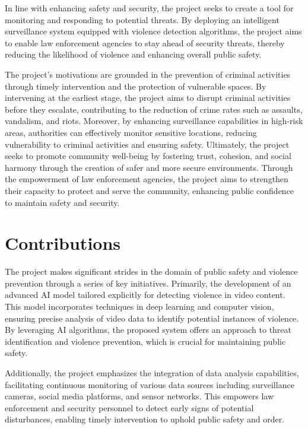 \noindent In line with enhancing safety and security, the project seeks to create a tool for monitoring and responding to potential threats. By deploying an intelligent surveillance system equipped with violence detection algorithms, the project aims to enable law enforcement agencies to stay ahead of security threats, thereby reducing the likelihood of violence and enhancing overall public safety. 

\noindent The project's motivations are grounded in the prevention of criminal activities through timely intervention and the protection of vulnerable spaces. By intervening at the earliest stage, the project aims to disrupt criminal activities before they escalate, contributing to the reduction of crime rates such as assaults, vandalism, and riots. Moreover, by enhancing surveillance capabilities in high-risk areas, authorities can effectively monitor sensitive locations, reducing vulnerability to criminal activities and ensuring safety. Ultimately, the project seeks to promote community well-being by fostering trust, cohesion, and social harmony through the creation of safer and more secure environments. Through the empowerment of law enforcement agencies, the project aims to strengthen their capacity to protect and serve the community, enhancing public confidence to maintain safety and security.

\clearpage

\section{Contributions}

\noindent The project makes significant strides in the domain of public safety and violence prevention through a series of key initiatives. Primarily, the development of an advanced AI model tailored explicitly for detecting violence in video content\cite{comp_vision}. This model incorporates techniques in deep learning and computer vision, ensuring precise analysis of video data to identify potential instances of violence. By leveraging AI algorithms, the proposed system offers an approach to threat identification and violence prevention, which is crucial for maintaining public safety.

\noindent Additionally, the project emphasizes the integration of data analysis capabilities, facilitating continuous monitoring of various data sources including surveillance cameras, social media platforms, and sensor networks\cite{Data_integrat}. This empowers law enforcement and security personnel to detect early signs of potential disturbances, enabling timely intervention to uphold public safety and order. 

